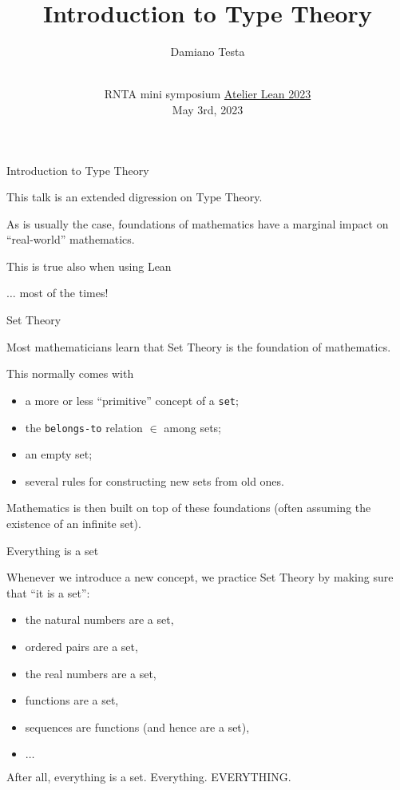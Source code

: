 \documentclass{beamer}
\title{Introduction to Type Theory}
\author{Damiano Testa}
\institute[]{University of Warwick}
\date[\href{http://www.rnta.eu/7MSRNTA/lean.html}{Atelier Lean 2023}]{\\
\vspace{50pt}
RNTA mini symposium
\href{http://www.rnta.eu/7MSRNTA/lean.html}{Atelier Lean 2023}\\
\vspace{20pt}
May 3rd, 2023
}
\begin{document}
\frame{\titlepage}

\begin{frame}[fragile]
{Introduction to Type Theory}

This talk is an extended digression on Type Theory.
\bigskip

As is usually the case, foundations of mathematics have a marginal impact on ``real-world'' mathematics.
\bigskip

This is true also when using Lean
\bigskip

$\ldots$ most of the times!
\end{frame}

\begin{frame}[fragile]{Set Theory}

Most mathematicians learn that Set Theory is the foundation of mathematics.

This normally comes with
\bigskip

\begin{itemize}
\item
  a more or less ``primitive'' concept of a {\color{purple}\verb`set`};
\item
  the {\color{purple}\verb`belongs-to`} relation $\in$ among sets;
\item
  an empty set;
\item
  several rules for constructing new sets from old ones.
\end{itemize}
\bigskip

Mathematics is then built on top of these foundations (often assuming the existence of an infinite set).
\end{frame}

\begin{frame}[fragile]{Everything is a set}

Whenever we introduce a new concept, we practice Set Theory by making sure that ``it is a set'':

\begin{itemize}
\item
  the natural numbers are a set,
\item
  ordered pairs are a set,
\item
  the real numbers are a set,
\item
  functions are a set,
\item
  sequences are functions (and hence are a set),
\item
  $\ldots$
\end{itemize}
\bigskip

After all, everything is a set. Everything. EVERYTHING.
\bigskip
\end{frame}
\end{document}
